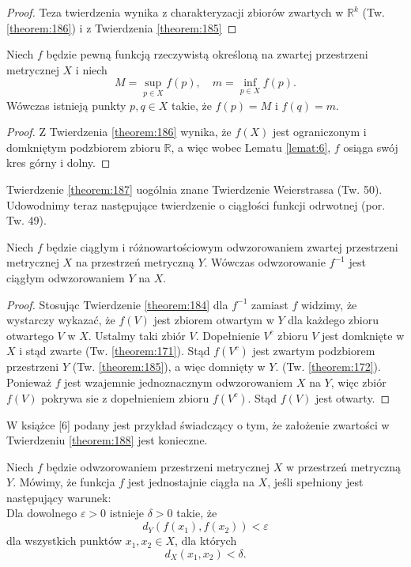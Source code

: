 \documentclass[leqno]{article}
\begin{document}
\begin{justify}
\begin{proof}
    Teza twierdzenia wynika z charakteryzacji zbiorów zwartych w $\mathbb{R}^k$ (Tw. \ref{theorem:186}) i z Twierdzenia \ref{theorem:185}
\end{proof}

\begin{theorem}
{
    Niech $f$ będzie pewną funkcją rzeczywistą określoną na zwartej przestrzeni metrycznej $X$ i niech
    \[
        M = \sup_{p \in X}f(p), \quad m = \inf_{p \in X}f(p).
    \]
    Wówczas istnieją punkty $p, q \in X$ takie, że $f(p) = M$ i $f(q) = m$.
}
\end{theorem}

\begin{proof}
    Z Twierdzenia \ref{theorem:186} wynika, że $f(X)$ jest ograniczonym i domkniętym podzbiorem zbioru $\mathbb{R}$, 
    a więc wobec Lematu \ref{lemat:6}, $f$ osiąga swój kres górny i dolny.
\end{proof}

Twierdzenie \ref{theorem:187} uogólnia znane Twierdzenie Weierstrassa (Tw. 50).
Udowodnimy teraz następujące twierdzenie o ciągłości funkcji odrwotnej (por. Tw. 49).

\begin{theorem}
{
    Niech $f$ będzie ciągłym i różnowartościowym odwzorowaniem zwartej przestrzeni metrycznej $X$ na przestrzeń metryczną $Y$.
    Wówczas odwzorowanie $f^{-1}$ jest ciągłym odwzorowaniem $Y$ na $X$.
}
\end{theorem}

\begin{proof}
    Stosując Twierdzenie \ref{theorem:184} dla $f^{-1}$ zamiast $f$ widzimy, że wystarczy wykazać, że $f(V)$ jest zbiorem otwartym w $Y$ dla każdego zbioru otwartego $V$ w $X$.
    Ustalmy taki zbiór $V$. Dopełnienie $V^c$ zbioru $V$ jest domknięte w $X$ i stąd zwarte (Tw. \ref{theorem:171}). Stąd $f(V^c)$ 
    jest zwartym podzbiorem przestrzeni $Y$ (Tw. \ref{theorem:185}), a więc domnięty w $Y$. (Tw. \ref{theorem:172}).
    Ponieważ $f$ jest wzajemnie jednoznacznym odwzorowaniem $X$ na $Y$, więc zbiór $f(V)$ pokrywa sie z dopełnieniem zbioru $f(V^c)$. Stąd $f(V)$ jest otwarty.
\end{proof}

W książce [6] podany jest przykład świadczący o tym, że założenie zwartości w Twierdzeniu \ref{theorem:188} jest konieczne.

\begin{defn}
    Niech $f$ będzie odwzorowaniem przestrzeni metrycznej $X$ w przestrzeń metryczną $Y$.
    Mówimy, że funkcja $f$ jest jednostajnie ciągła na $X$, jeśli spełniony jest następujący warunek: \\
    Dla dowolnego $\varepsilon > 0$ istnieje $\delta > 0$ takie, że 
    \[
        d_Y(f(x_1), f(x_2)) < \varepsilon
    \]
    dla wszystkich punktów $x_1, x_2 \in X$, dla których
    \[
        d_X(x_1, x_2) < \delta.
    \]
\end{defn}


\end{justify}
\end{document}
